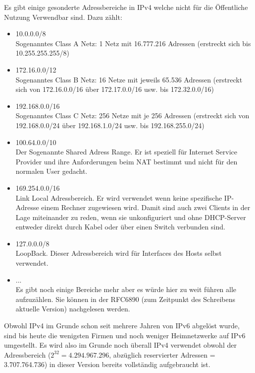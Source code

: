 \documentclass[11pt,a4paper]{report}
\begin{document}
Es gibt einige gesonderte Adressbereiche in IPv4 welche nicht für die Öffentliche Nutzung Verwendbar sind. Dazu zählt:
\begin{itemize}
\item 10.0.0.0/8\\
Sogenanntes Class A Netz: 1 Netz mit 16.777.216 Adressen (erstreckt sich bis 10.255.255.255/8)
\item 172.16.0.0/12\\
Sogenanntes Class B Netz: 16 Netze mit jeweils 65.536 Adressen (erstreckt sich von 172.16.0.0/16 über 172.17.0.0/16 usw. bis 172.32.0.0/16)
\item 192.168.0.0/16\\
Sogenanntes Class C Netz: 256 Netze mit je 256 Adressen (erstreckt sich von 192.168.0.0/24 über 192.168.1.0/24 usw. bis 192.168.255.0/24)
\item 100.64.0.0/10\\
Der Sogenannte Shared Adress Range. Er ist speziell für Internet Service Provider und ihre Anforderungen beim NAT bestimmt und nicht für den normalen User gedacht.
\item 169.254.0.0/16\\
Link Local Adressbereich. Er wird verwendet wenn keine spezifische IP-Adresse einem Rechner zugewiesen wird. Damit sind auch zwei Clients in der Lage miteinander zu reden, wenn sie unkonfiguriert und ohne DHCP-Server entweder direkt durch Kabel oder über einen Switch verbunden sind.
\item 127.0.0.0/8\\
LoopBack. Dieser Adressbereich wird für Interfaces des Hosts selbst verwendet. 
\item ...\\
Es gibt noch einige Bereiche mehr aber es würde hier zu weit führen alle aufzuzählen. Sie können in der RFC6890 (zum Zeitpunkt des Schreibens aktuelle Version) nachgelesen werden.
\end{itemize}

Obwohl IPv4 im Grunde schon seit mehrere Jahren von IPv6 abgelöst wurde, sind bis heute die wenigsten Firmen und noch weniger Heimnetzwerke auf IPv6 umgestellt. Es wird also im Grunde noch überall IPv4 verwendet obwohl der Adressbereich ($2^{32} = 4.294.967.296$, abzüglich reservierter Adressen = 3.707.764.736) in dieser Version bereits vollständig aufgebraucht ist.\\
\end{document}
